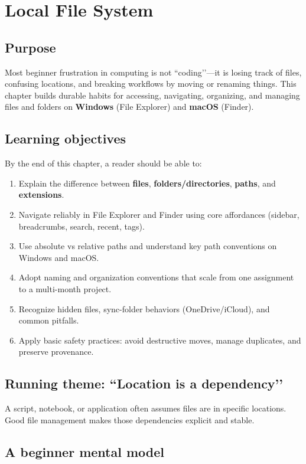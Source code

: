 \chapter{Local File System}
\label{ch:filesystem}

\section*{Purpose}
Most beginner frustration in computing is not ``coding’’—it is losing track of files, confusing locations, and breaking workflows by moving or renaming things. This chapter builds durable habits for accessing, navigating, organizing, and managing files and folders on \textbf{Windows} (File Explorer) and \textbf{macOS} (Finder).

\section*{Learning objectives}
By the end of this chapter, a reader should be able to:
\begin{enumerate}
\item Explain the difference between \textbf{files}, \textbf{folders/directories}, \textbf{paths}, and \textbf{extensions}.
\item Navigate reliably in File Explorer and Finder using core affordances (sidebar, breadcrumbs, search, recent, tags).
\item Use absolute vs relative paths and understand key path conventions on Windows and macOS.
\item Adopt naming and organization conventions that scale from one assignment to a multi-month project.
\item Recognize hidden files, sync-folder behaviors (OneDrive/iCloud), and common pitfalls.
\item Apply basic safety practices: avoid destructive moves, manage duplicates, and preserve provenance.
\end{enumerate}

\section*{Running theme: ``Location is a dependency’’}
A script, notebook, or application often assumes files are in specific locations. Good file management makes those dependencies explicit and stable.

\section{A beginner mental model}
